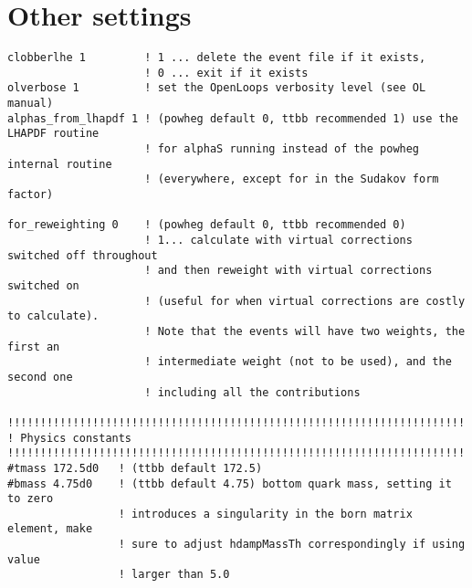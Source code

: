 \section{Other settings}
\begin{lstlisting}[basicstyle=\ttfamily\scriptsize,frame = single]
clobberlhe 1         ! 1 ... delete the event file if it exists, 
                     ! 0 ... exit if it exists
olverbose 1          ! set the OpenLoops verbosity level (see OL manual)
alphas_from_lhapdf 1 ! (powheg default 0, ttbb recommended 1) use the LHAPDF routine
                     ! for alphaS running instead of the powheg internal routine
                     ! (everywhere, except for in the Sudakov form factor)

for_reweighting 0    ! (powheg default 0, ttbb recommended 0) 
                     ! 1... calculate with virtual corrections switched off throughout
                     ! and then reweight with virtual corrections switched on
                     ! (useful for when virtual corrections are costly to calculate).
                     ! Note that the events will have two weights, the first an
                     ! intermediate weight (not to be used), and the second one
                     ! including all the contributions

!!!!!!!!!!!!!!!!!!!!!!!!!!!!!!!!!!!!!!!!!!!!!!!!!!!!!!!!!!!!!!!!!!!!!!!!!!!!!!!!!!!!!!
! Physics constants 
!!!!!!!!!!!!!!!!!!!!!!!!!!!!!!!!!!!!!!!!!!!!!!!!!!!!!!!!!!!!!!!!!!!!!!!!!!!!!!!!!!!!!!
#tmass 172.5d0   ! (ttbb default 172.5)
#bmass 4.75d0    ! (ttbb default 4.75) bottom quark mass, setting it to zero
                 ! introduces a singularity in the born matrix element, make
                 ! sure to adjust hdampMassTh correspondingly if using value
                 ! larger than 5.0

\end{lstlisting}



